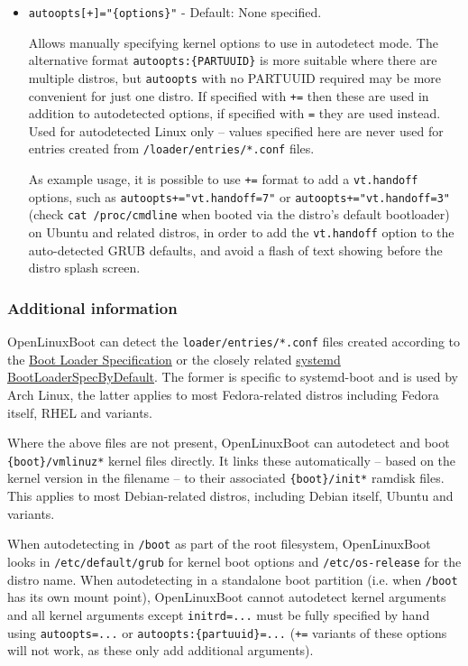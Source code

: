 \documentclass[]{article}
\begin{document}
\begin{itemize}
  \item \texttt{autoopts[+]="\{options\}"} - Default: None specified. \medskip

  Allows manually specifying kernel options to use in autodetect mode. The alternative format \texttt{autoopts:\{PARTUUID\}}
  is more suitable where there are multiple distros, but \texttt{autoopts} with no PARTUUID required may be more
  convenient for just one distro.
  If specified with \texttt{+=} then these are used in addition to autodetected options, if specified
  with \texttt{=} they are used instead. Used for autodetected Linux only -- values specified here are never
  used for entries created from \texttt{/loader/entries/*.conf} files.
  \medskip

  As example usage, it is possible to use \texttt{+=} format to add
  a \texttt{vt.handoff} options, such as \texttt{autoopts+="vt.handoff=7"} or \texttt{autoopts+="vt.handoff=3"}
  (check \texttt{cat /proc/cmdline} when booted via the distro's default bootloader) on Ubuntu and related distros,
  in order to add the \texttt{vt.handoff} option to the auto-detected GRUB defaults, and avoid a flash of text
  showing before the distro splash screen.
  \medskip
\end{itemize}

\subsubsection{Additional information}

OpenLinuxBoot can detect the \texttt{loader/entries/*.conf} files created according to the
\href{https://systemd.io/BOOT_LOADER_SPECIFICATION/}{Boot Loader Specification} or the closely related
\href{https://fedoraproject.org/wiki/Changes/BootLoaderSpecByDefault}{systemd BootLoaderSpecByDefault}. The
former is specific to systemd-boot and is used by Arch Linux, the latter applies to most Fedora-related distros
including Fedora itself, RHEL and variants.

Where the above files are not present, OpenLinuxBoot can autodetect and
boot \texttt{\{boot\}/vmlinuz*} kernel files directly. It links these automatically -- based on the
kernel version in the filename -- to their associated \texttt{\{boot\}/init*} ramdisk files.
This applies to most Debian-related distros, including Debian itself, Ubuntu and variants.

When autodetecting in \texttt{/boot} as part of the root filesystem, OpenLinuxBoot looks in \texttt{/etc/default/grub}
for kernel boot options and \texttt{/etc/os-release} for the distro name. When autodetecting in a standalone boot
partition (i.e. when \texttt{/boot} has its own mount point), OpenLinuxBoot cannot autodetect kernel arguments and
all kernel arguments except \texttt{initrd=...} must be fully specified by hand using \texttt{autoopts=...} or
\texttt{autoopts:\{partuuid\}=...} (\texttt{+=} variants of these options will not work, as these only add additional
arguments).
\end{document}
